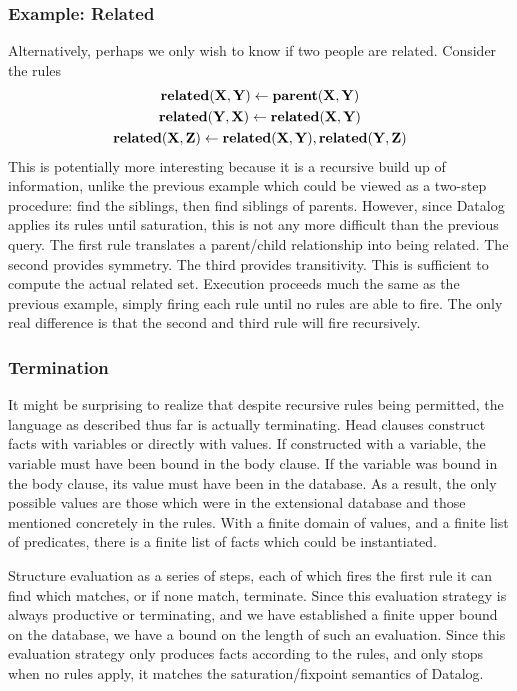 \subsubsection{Example: Related}
Alternatively, perhaps we only wish to know if two people are related.
Consider the rules
\begin{gather*}
        {\bf related}({\bf X}, {\bf Y}) \leftarrow {\bf parent}({\bf X}, {\bf Y})\\
        {\bf related}({\bf Y}, {\bf X}) \leftarrow {\bf related}({\bf X}, {\bf Y})\\
        {\bf related}({\bf X}, {\bf Z}) \leftarrow {\bf related}({\bf X}, {\bf Y}), {\bf related}({\bf Y}, {\bf Z})
\end{gather*}
This is potentially more interesting because it is a recursive build up of information, unlike the previous example which could be viewed as a two-step procedure: find the siblings, then find siblings of parents.
However, since Datalog applies its rules until saturation, this is not any more difficult than the previous query.
The first rule translates a parent/child relationship into being related.
The second provides symmetry.
The third provides transitivity.
This is sufficient to compute the actual related set.
Execution proceeds much the same as the previous example, simply firing each rule until no rules are able to fire.
The only real difference is that the second and third rule will fire recursively.
\subsubsection{Termination}
It might be surprising to realize that despite recursive rules being permitted, the language as described thus far is actually terminating.
Head clauses construct facts with variables or directly with values.
If constructed with a variable, the variable must have been bound in the body clause.
If the variable was bound in the body clause, its value must have been in the database.
As a result, the only possible values are those which were in the extensional database and those mentioned concretely in the rules.
With a finite domain of values, and a finite list of predicates, there is a finite list of facts which could be instantiated.

Structure evaluation as a series of steps, each of which fires the first rule it can find which matches, or if none match, terminate.
Since this evaluation strategy is always productive or terminating, and we have established a finite upper bound on the database, we have a bound on the length of such an evaluation.
Since this evaluation strategy only produces facts according to the rules, and only stops when no rules apply, it matches the saturation/fixpoint semantics of Datalog.

